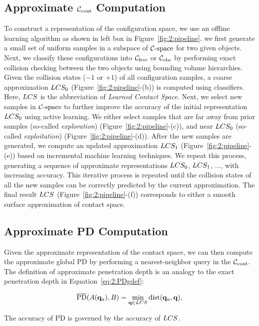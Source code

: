 \subsection{Approximate $\mathcal C_\text{cont}$ Computation}
To construct a representation of the configuration space, we use an offline learning algorithm as shown in left box in Figure~\ref{fig:2:pipeline}. we first generate a small set of uniform samples in a subspace of $\mathcal C\text{-space}$ for two given objects. Next, we classify these configurations into $\mathcal C_{\text{free}}$ or $\mathcal C_{\text{obs}}$ by performing exact collision checking between the two objects using bounding volume hierarchies. Given the collision states ($-1$ or $+1$) of all configuration samples, a coarse approximation $LCS_0$ (Figure~\ref{fig:2:pipeline}-(b)) is computed using classifiers. Here, $LCS$ is the abbreviation of \emph{Learned Contact Space}. Next, we select new samples in $\mathcal C\text{-space}$ to further improve the accuracy of the initial representation $LCS_0$ using active learning. We either select samples that are far away from prior samples (so-called \emph{exploration}) (Figure~\ref{fig:2:pipeline}-(c)), and near $LCS_0$ (so-called \emph{exploitation}) (Figure~\ref{fig:2:pipeline}-(d)).
After the new samples are generated, we compute an updated
approximation $LCS_1$ (Figure~\ref{fig:2:pipeline}-(e)) based on incremental
machine learning techniques. We repeat this process, generating a sequence of approximate representations
$LCS_0$, $LCS_1$, ..., with increasing accuracy. This iterative process is repeated until the
collision states of all the new samples can be correctly
predicted by the current approximation. The final result $LCS$
(Figure~\ref{fig:2:pipeline}-(f)) corresponds to either a smooth surface approximation of contact space.

\subsection{Approximate PD Computation}
Given the approximate representation of the contact space, we can
then compute the approximate global PD by performing a nearest-neighbor query in the $\mathcal C_\text{cont}$.
The definition of approximate penetration depth is an analogy to the exact penetration depth in Equation~\ref{eq:2:PDgdef}:

\begin{align}
\label{eq:2:PDsdef} \overline{\text{PD}}(A(\mathbf q_a), B) = \min_{\mathbf q \in LCS}\operatorname{dist}(\mathbf q_a, \mathbf q),
\end{align}

The accuracy of $\overline{\text{PD}}$ is governed by the accuracy of $LCS$.


